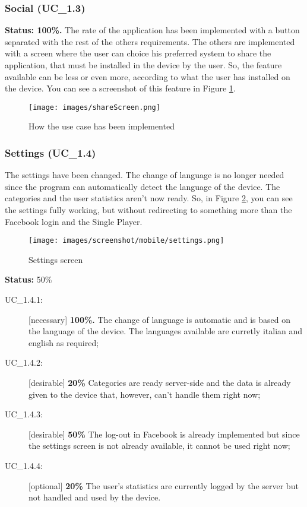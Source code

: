 \subsubsection{Social (UC\_1.3)}
\textbf{Status: 100\%.} The rate of the application has been implemented with a button separated with the rest of the others requirements. The others are implemented with a screen where the user can choice his preferred system to share the application, that must be installed in the device by the user. So, the feature available can be less or even more, according to what the user has installed on the device. You can see a screenshot of this feature in Figure \ref{fig:shareGufy}.

\begin{figure}[H]
\centering %
\texttt{[image: images/shareScreen.png]}
\caption{How the use case has been implemented}
\label{fig:shareGufy}
\end{figure}

\subsubsection{Settings (UC\_1.4)}
\label{sec:settingsActualApplication}

The settings have been changed. The change of language is no longer needed since the program can automatically detect the language of the device. The categories and the user statistics aren't now ready. So, in Figure \ref{fig:settings}, you can see the settings fully working, but without redirecting to something more than the Facebook login and the Single Player.

\begin{figure}[H]
\centering %
\texttt{[image: images/screenshot/mobile/settings.png]}
\caption{Settings screen}
\label{fig:settings}
\end{figure}

\textbf{Status:} 50\%
		\begin{description}
			\item[UC\_1.4.1:] [necessary] \textbf{100\%.} The change of language is automatic and is based on the language of the device. The languages available are curretly italian and english as required;
			\item[UC\_1.4.2:] [desirable] \textbf{20\%} Categories are ready server-side and the data is already given to the device that, however, can't handle them right now;
			\item[UC\_1.4.3:] [desirable] \textbf{50\%} The log-out in Facebook is already implemented but since the settings screen is not already available, it cannot be used right now;
			\item[UC\_1.4.4:] [optional] \textbf{20\%} The user's statistics are currently logged by the server but not handled and used by the device.
		\end{description}

